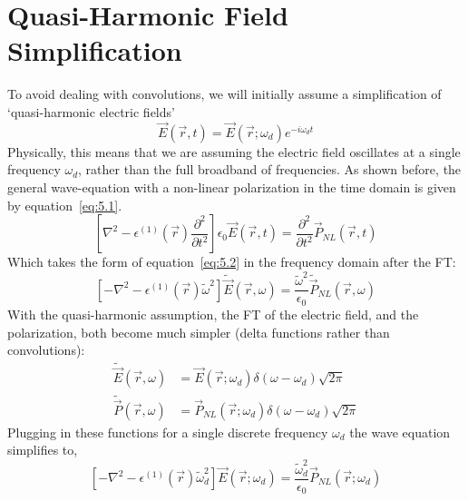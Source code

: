 \documentclass[12pt]{article}
\begin{document}
\section{Quasi-Harmonic Field Simplification}
To avoid dealing with convolutions, we will initially assume a simplification of ‘quasi-harmonic electric fields’ 
\begin{equation*}
\vec{E}(\vec{r}, t) = \vec{E}(\vec{r}; \omega_d) e^{-i\omega_d t}
\end{equation*}
Physically, this means that we are assuming the electric field oscillates at a single frequency $\omega_d$, rather than the full broadband of frequencies. 
As shown before, the general wave-equation with a non-linear polarization in the time domain is given by equation~\ref{eq:5.1}.
\begin{equation}
\left[ \nabla^2 - \epsilon^{(1)}(\vec{r}) \frac{\partial^2}{\partial t^2} \right] \epsilon_0 \vec{E}(\vec{r}, t) = \frac{\partial^2}{\partial t^2} \vec{P}_{NL}(\vec{r}, t)
\label{eq:5.1}
\end{equation}
Which takes the form of equation~\ref{eq:5.2} in the frequency domain after the FT:
\begin{equation}
\left[ -\nabla^2 - \epsilon^{(1)}(\vec{r}) \tilde{\omega}^2 \right] \tilde{\vec{E}}(\vec{r}, \omega) = \frac{\tilde{\omega}^2}{\epsilon_0} \tilde{\vec{P}}_{NL}(\vec{r}, \omega)
\label{eq:5.2}
\end{equation}
With the quasi-harmonic assumption, the FT of the electric field, and the polarization, both become much simpler (delta functions rather than convolutions):
\begin{align*}
\tilde{\vec{E}}(\vec{r}, \omega) &= \vec{E}(\vec{r}; \omega_d) \delta(\omega - \omega_d) \sqrt{2\pi} \\
\tilde{\vec{P}}(\vec{r}, \omega) &= \vec{P}_{NL}(\vec{r}; \omega_d) \delta(\omega - \omega_d) \sqrt{2\pi}
\end{align*}
Plugging in these functions for a single discrete frequency $\omega_d$ the wave equation simplifies to,
\begin{equation}
\left[ -\nabla^2 - \epsilon^{(1)}(\vec{r}) \tilde{\omega}_d^2 \right] \vec{E}(\vec{r}; \omega_d) = \frac{\tilde{\omega}_d^2}{\epsilon_0} \vec{P}_{NL}(\vec{r}; \omega_d)
\label{eq:5.3}
\end{equation}
\end{document}
